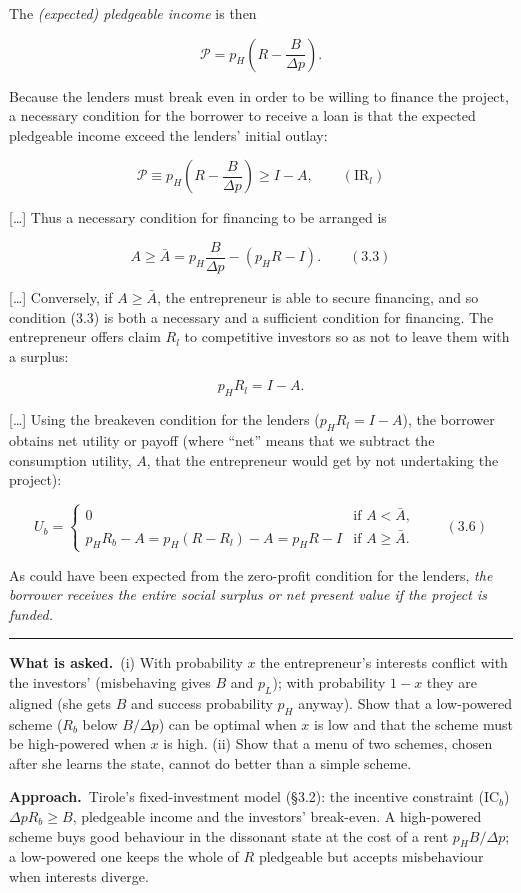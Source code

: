 \documentclass[11pt,a4paper]{article}
\newcommand{\asked}{\par\medskip\noindent\textbf{What is asked.}~}
\newcommand{\approach}{\par\smallskip\noindent\textbf{Approach.}~}
\newcommand{\dpp}{\Delta p}
\newcommand{\stmtend}{\par\endgroup\nopagebreak\noindent\rule{\linewidth}{0.4pt}\par\medskip}
\begin{document}
The \emph{(expected) pledgeable income} is then

\[\mathcal{P} = p_H\left(R - \frac{B}{\Delta p}\right).\]

Because the lenders must break even in order to be willing to finance the project, a necessary
condition for the borrower to receive a loan is that the expected pledgeable income exceed the
lenders' initial outlay:

\[\mathcal{P} \equiv p_H\left(R - \frac{B}{\Delta p}\right) \geqslant I - A, \qquad (\text{IR}_l)\]

{[}\ldots{]} Thus a necessary condition for financing to be arranged is

\[A \geqslant \bar A = p_H \frac{B}{\Delta p} - (p_H R - I). \qquad (3.3)\]

{[}\ldots{]} Conversely, if \(A \geqslant \bar A\), the entrepreneur is able to secure financing,
and so condition (3.3) is both a necessary and a sufficient condition for financing. The
entrepreneur offers claim \(R_l\) to competitive investors so as not to leave them with a surplus:

\[p_H R_l = I - A.\]

{[}\ldots{]} Using the breakeven condition for the lenders (\(p_H R_l = I - A\)), the borrower
obtains net utility or payoff (where ``net'' means that we subtract the consumption utility, \(A\),
that the entrepreneur would get by not undertaking the project):

\[U_b = \begin{cases} 0 & \text{if } A < \bar A, \\ p_H R_b - A = p_H(R - R_l) - A = p_H R - I & \text{if } A \geqslant \bar A. \end{cases} \qquad (3.6)\]

As could have been expected from the zero-profit condition for the lenders, \emph{the borrower
receives the entire social surplus or net present value if the project is funded.}
\stmtend

\asked (i) With probability $x$ the entrepreneur's interests conflict with the investors' (misbehaving gives $B$ and $p_L$); with probability $1-x$ they are aligned (she gets $B$ and success probability $p_H$ anyway). Show that a low-powered scheme ($R_b$ below $B/\dpp$) can be optimal when $x$ is low and that the scheme must be high-powered when $x$ is high. (ii) Show that a menu of two schemes, chosen after she learns the state, cannot do better than a simple scheme.

\approach Tirole's fixed-investment model (\S3.2): the incentive constraint (IC$_b$) $\dpp R_b\ge B$, pledgeable income and the investors' break-even. A high-powered scheme buys good behaviour in the dissonant state at the cost of a rent $p_HB/\dpp$; a low-powered one keeps the whole of $R$ pledgeable but accepts misbehaviour when interests diverge.
\end{document}
